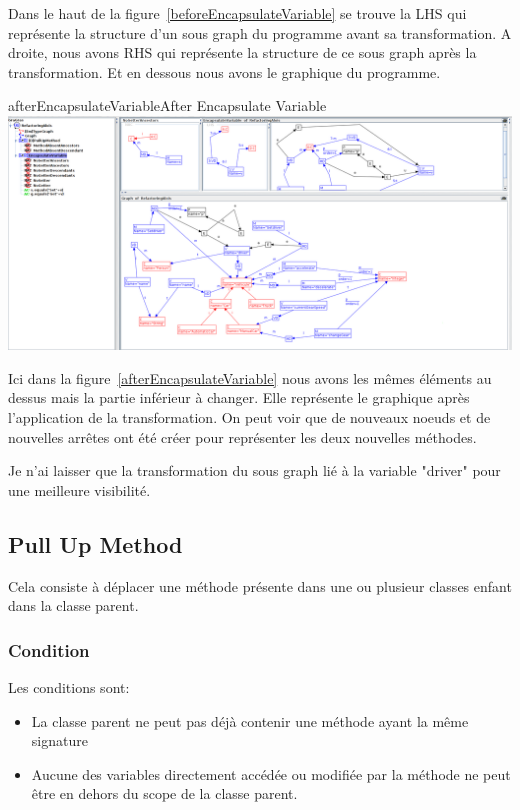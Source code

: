 \documentclass[a4paper, 12pt]{article}
\begin{document}
\begin{enumerate}
Dans le haut de la figure~\ref{beforeEncapsulateVariable} se trouve la LHS qui représente la structure d'un sous graph du programme avant sa transformation. A droite, nous avons RHS qui représente la structure de ce sous graph après la transformation. Et en dessous nous avons le graphique du programme.

\begin{myfig}{afterEncapsulateVariable}{After Encapsulate Variable}
\includegraphics[width=\textwidth]{afterEncapsulateVariable.png}
\end{myfig}

Ici dans la figure~\ref{afterEncapsulateVariable} nous avons les mêmes éléments au dessus mais la partie inférieur à changer. 
Elle représente le graphique après l'application de la transformation. On peut voir que de nouveaux noeuds et de nouvelles arrêtes ont été créer pour représenter les deux nouvelles méthodes.

Je n'ai laisser que la transformation du sous graph lié à la variable "driver" pour une meilleure visibilité.

\subsection{Pull Up Method}

Cela consiste à déplacer une méthode présente dans une ou plusieur classes enfant dans la classe parent. 

\subsubsection{Condition}
Les conditions sont:
\begin{itemize}
\item La classe parent ne peut pas déjà contenir une méthode ayant la même signature
\item Aucune des variables directement accédée ou modifiée par la méthode ne peut être en dehors du scope de la classe parent.
\end{itemize}


\end{enumerate}
\end{document}
